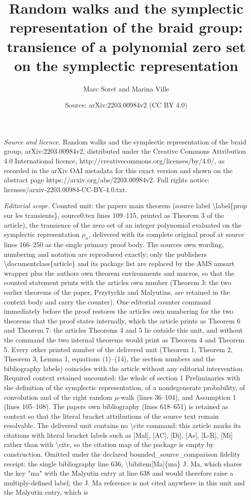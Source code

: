 \documentclass[10pt,a4paper]{amsart}
\title[Random walks and the symplectic representation of the braid group]{Random walks and the symplectic representation of the braid group: transience of a polynomial zero set on the symplectic representation}
\author{Marc Soret and Marina Ville}
\date{Source: arXiv:2203.00984v2 (CC BY 4.0)}
\begin{document}
\maketitle
\noindent\emph{Source and licence.} Random walks and the symplectic representation of the braid group, arXiv:2203.00984v2, distributed under the Creative Commons Attribution 4.0 International licence, http://creativecommons.org/licenses/by/4.0/, as recorded in the arXiv OAI metadata for this exact version and shown on the abstract page https://arxiv.org/abs/2203.00984v2. Full rights notice: licenses/arxiv-2203.00984-CC-BY-4.0.txt.\par\smallskip
\noindent\textit{Editorial scope.} Counted unit: the paper\textquotesingle s main theorem (source label \textbackslash{}label\{prop sur les transients\}, source0.tex lines 109--115, printed as Theorem 3 of the article), the transience of the zero set of an integer polynomial evaluated on the symplectic representation $\rho_n$, delivered with its complete original proof at source lines 166--250 as the single primary proof body. The source\textquotesingle s own wording, numbering and notation are reproduced exactly; only the publisher\textquotesingle s \textbackslash{}documentclass\{article\} and its package list are replaced by the AMS amsart wrapper plus the author\textquotesingle s own theorem environments and macros, so that the counted statement prints with the article\textquotesingle s own number (Theorem 3: the two earlier theorems of the paper, Przytycki\textquotesingle s and Malyutin\textquotesingle s, are retained in the context body and carry the counter). One editorial counter command immediately before the proof restores the article\textquotesingle s own numbering for the two theorems that the proof states internally, which the article prints as Theorem 6 and Theorem 7: the article\textquotesingle s Theorems 4 and 5 lie outside this unit, and without the command the two internal theorems would print as Theorem 4 and Theorem 5. Every other printed number of the delivered unit (Theorem 1, Theorem 2, Theorem 3, Lemma 1, equations (1)--(14), the section numbers and the bibliography labels) coincides with the article without any editorial intervention. Required context retained uncounted: the whole of section 1 Preliminaries with the definition of the symplectic representation, of a nondegenerate probability, of convolution and of the right random $\mu$-walk (lines 36--104), and Assumption 1 (lines 105--108). The paper\textquotesingle s own bibliography (lines 618--651) is retained as context so that the literal bracket attributions of the source text remain resolvable. The delivered unit contains no \textbackslash{}cite command: this article marks its citations with literal bracket labels such as [Mal], [A\textquotesingle C], [Di], [As], [L-R], [Mi] rather than with \textbackslash{}cite, so the citation map of the package is empty by construction. Omitted under the declared bounded\_source\_comparison fidelity receipt: the single bibliography line 636, \textbackslash{}bibitem[Ma]\{ma\} J. Ma, which shares the key "ma" with the Malyutin entry at line 638 and would therefore raise a multiply-defined label; the J. Ma reference is not cited anywhere in this unit and the Malyutin entry, which is 
\end{document}
